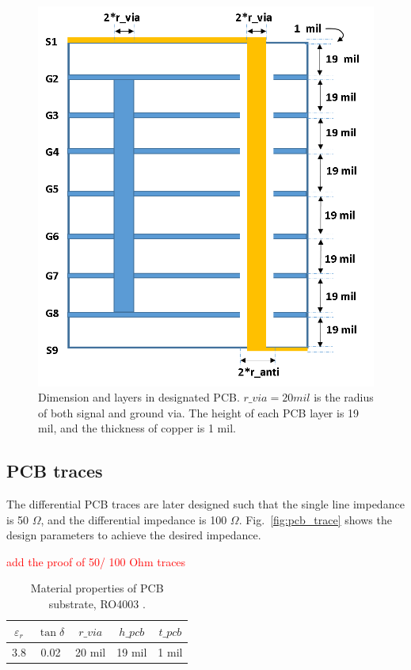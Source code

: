 \documentclass{pj}
\newcommand{\highlight}[1]{\Huge\textcolor{red}{#1}\normalsize}
\begin{document}
\begin{figure}[htbp!]
	\centering
	\includegraphics[width=0.8\columnwidth]{./img/PCB/PCB_layer_dimension.png}
	\caption{Dimension and layers in designated PCB. $r\_via=20 mil$ is the radius of both signal and ground via. The height of each PCB layer is 19 mil, and the thickness of copper is 1 mil. }
	\label{fig:pcb_layers} %
\end{figure}


\subsection{PCB traces}
The differential PCB traces are later designed such that the single line impedance is 50 $\Omega$, and the differential impedance is 100 $\Omega$. Fig.~\ref{fig:pcb_trace} shows the design parameters to achieve the desired impedance.

\highlight{add the proof of 50/ 100 Ohm traces}

\begin{table}[h]
	\renewcommand{\arraystretch}{1.3}
	\caption{Material properties of PCB substrate, RO4003 \cite{na_ro4003_rogers}.}
	\vskip0.2in
	\begin{center}
		\begin{tabular}{| c | c | c | c | c |}
			\hline
			$\varepsilon_r$ & $\tan\delta$ & $r\_via$ & $h\_pcb$ & $t\_pcb$\\ \hline
			3.8 & 0.02 & 20 mil & 19 mil & 1 mil\\
			\hline
		\end{tabular}
	\end{center}
	\label{table:ro4003}			
\end{table}
\end{document}
